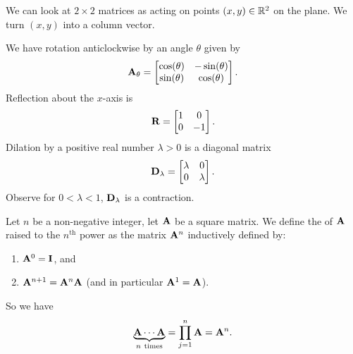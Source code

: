 \begin{example}\label{ex:matrix-algebra:plane-geometry}
We can look at $2\times2$ matrices as acting on points $(x,y)\in\mathbb{R}^{2}$
on the plane. We turn $(x,y)$ into a column vector.

We have rotation anticlockwise by an angle
$\theta$ given by
\begin{equation}
\mathbf{A}_{\theta} = \begin{bmatrix}\cos(\theta) & -\sin(\theta)\\
\sin(\theta) & \cos(\theta)
\end{bmatrix}.
\end{equation}
Reflection about the $x$-axis is
\begin{equation}
\mathbf{R}  =\begin{bmatrix}1 & 0\\0 & -1
\end{bmatrix}.
\end{equation}
Dilation by a positive real number $\lambda>0$ is a diagonal matrix
\begin{equation}
  \mathbf{D}_{\lambda} =\begin{bmatrix}\lambda & 0\\
  0 & \lambda
  \end{bmatrix}.
\end{equation}
Observe for $0<\lambda<1$, $\mathbf{D}_{\lambda}$ is a contraction.
\end{example}

\begin{definition}
Let $n$ be a non-negative integer, let $\mathbf{A}$ be a square matrix.
We define the  of $\mathbf{A}$ raised to the
$n^{\text{th}}$ power as the matrix $\mathbf{A}^{n}$ inductively defined by:
\begin{enumerate}
\item $\mathbf{A}^{0}=\mathbf{I}$, and
\item $\mathbf{A}^{n+1}=\mathbf{A}^{n}\mathbf{A}$ (and in particular $\mathbf{A}^{1}=\mathbf{A}$).
\end{enumerate}
So we have
\begin{equation}
\underbrace{\mathbf{A}\cdots\mathbf{A}}_{n~\text{times}}=\prod^{n}_{j=1}\mathbf{A}=\mathbf{A}^{n}.
\end{equation}
\end{definition}

